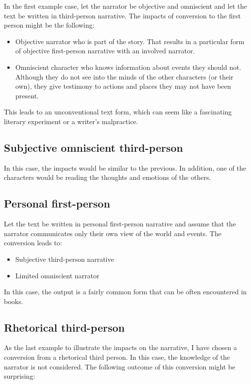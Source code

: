 In the first example case, let the narrator be objective and omniscient and let the text be written in third-person narrative. The impacts of conversion to the first person might be the following:

\begin{itemize}
	\item Objective narrator who is part of the story. That results in a particular form of objective first-person narrative with an involved narrator.
	\item Omniscient character who knows information about events they should not. Although they do not see into the minds of the other characters (or their own), they give testimony to actions and places they may not have been present.
\end{itemize}

This leads to an unconventional text form, which can seem like a fascinating literary experiment or a writer's malpractice.

\subsection*{Subjective omniscient third-person}

In this case, the impacts would be similar to the previous. In addition, one of the characters would be reading the thoughts and emotions of the others.

\subsection*{Personal first-person}

Let the text be written in personal first-person narrative and assume that the narrator communicates only their own view of the world and events. The conversion leads to:

\begin{itemize}
	\item Subjective third-person narrative
	\item Limited omniscient narrator
\end{itemize}

In this case, the output is a fairly common form that can be often encountered in books.

\subsection*{Rhetorical third-person}

As the last example to illustrate the impacts on the narrative, I have chosen a conversion from a rhetorical third person. In this case, the knowledge of the narrator is not considered. The following outcome of this conversion might be surprising:

